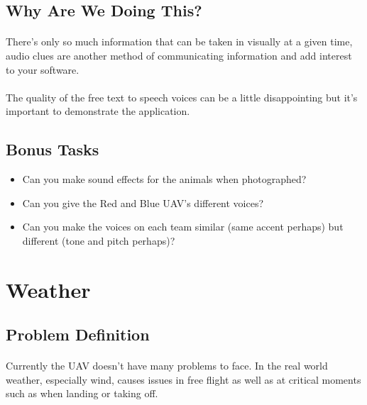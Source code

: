 \documentclass[11pt]{book}
\begin{document}
\subsection{Why Are We Doing This?}

\paragraph{} There's only so much information that can be taken in visually at a given time, audio clues are another method of communicating information and add interest to your software.

\paragraph{} The quality of the free text to speech voices can be a little disappointing but it's important to demonstrate the application.

\subsection{Bonus Tasks}

\begin{itemize}
\item Can you make sound effects for the animals when photographed?
\item Can you give the Red and Blue UAV's different voices?
\item Can you make the voices on each team similar (same accent perhaps) but different (tone and pitch perhaps)?
\end{itemize}

\clearpage


\section{Weather}

\subsection{Problem Definition}

\paragraph{} Currently the UAV doesn't have many problems to face. In the real world weather, especially wind, causes issues in free flight as well as at critical moments such as when landing or taking off.
\end{document}
